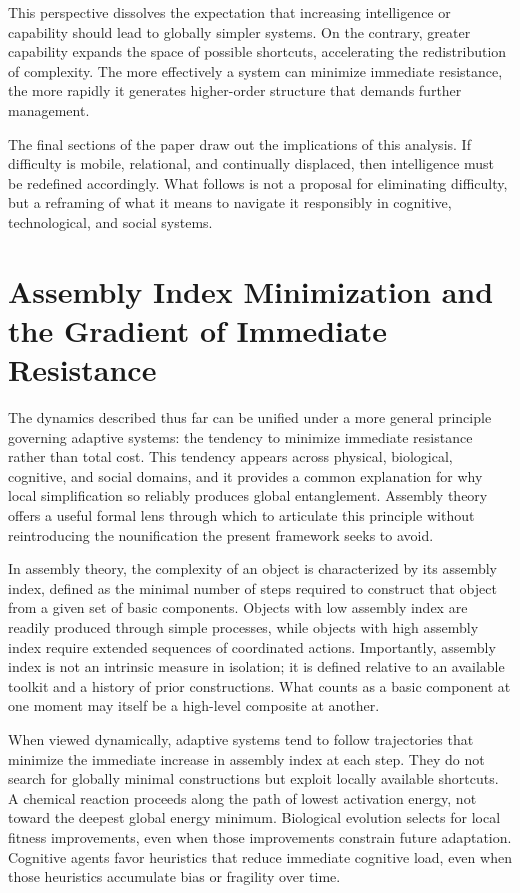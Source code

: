 \documentclass[12pt]{article}
\begin{document}
This perspective dissolves the expectation that increasing intelligence or capability should lead to globally simpler systems. On the contrary, greater capability expands the space of possible shortcuts, accelerating the redistribution of complexity. The more effectively a system can minimize immediate resistance, the more rapidly it generates higher-order structure that demands further management.

The final sections of the paper draw out the implications of this analysis. If difficulty is mobile, relational, and continually displaced, then intelligence must be redefined accordingly. What follows is not a proposal for eliminating difficulty, but a reframing of what it means to navigate it responsibly in cognitive, technological, and social systems.

\section{Assembly Index Minimization and the Gradient of Immediate Resistance}

The dynamics described thus far can be unified under a more general principle governing adaptive systems: the tendency to minimize immediate resistance rather than total cost. This tendency appears across physical, biological, cognitive, and social domains, and it provides a common explanation for why local simplification so reliably produces global entanglement. Assembly theory offers a useful formal lens through which to articulate this principle without reintroducing the nounification the present framework seeks to avoid.

In assembly theory, the complexity of an object is characterized by its assembly index, defined as the minimal number of steps required to construct that object from a given set of basic components. Objects with low assembly index are readily produced through simple processes, while objects with high assembly index require extended sequences of coordinated actions. Importantly, assembly index is not an intrinsic measure in isolation; it is defined relative to an available toolkit and a history of prior constructions. What counts as a basic component at one moment may itself be a high-level composite at another.

When viewed dynamically, adaptive systems tend to follow trajectories that minimize the immediate increase in assembly index at each step. They do not search for globally minimal constructions but exploit locally available shortcuts. A chemical reaction proceeds along the path of lowest activation energy, not toward the deepest global energy minimum. Biological evolution selects for local fitness improvements, even when those improvements constrain future adaptation. Cognitive agents favor heuristics that reduce immediate cognitive load, even when those heuristics accumulate bias or fragility over time.
\end{document}
